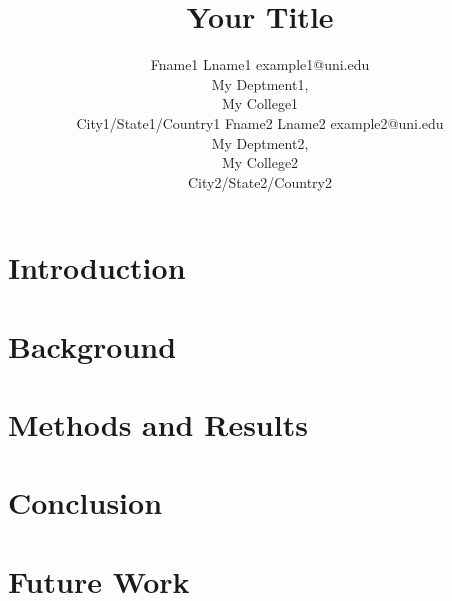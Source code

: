 \documentclass[11pt]{article}
\begin{document}
\title{Your Title}

\author{\name Fname1 Lname1 \email example1@uni.edu \\
       \addr My Deptment1,\\
       My College1\\
       City1/State1/Country1
       \AND
       \name Fname2 Lname2 \email example2@uni.edu \\
       \addr My Deptment2,\\
       My College2\\
       City2/State2/Country2
       }

\maketitle


\begin{abstract}

\end{abstract}

\section{Introduction}
\label{sec:Introduction}


\section{Background}
\label{sec:Background}


\section{Methods and Results}
\label{sec:Methods}


\section{Conclusion}
\label{sec:Conclusion}


\section{Future Work}
\label{sec:FutureWork}

\acks{}
\end{document}
